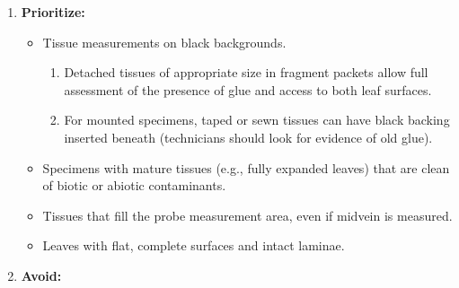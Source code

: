 \documentclass[
  letterpaper,
  DIV=11,
  numbers=noendperiod]{scrreprt}
\providecommand{\tightlist}{%
  \setlength{\itemsep}{0pt}\setlength{\parskip}{0pt}}
\begin{document}
\begin{enumerate}
  \begin{itemize}
  \tightlist
  \item
    Metadata collection is a critical component for understanding
    factors affecting spectral data quality and will provide confidence
    during data aggregation.\\
  \item
    Herbaria and research teams should train technicians in specimen
    selection strategies and scoring metadata to reduce subjectivity.
  \end{itemize}
\item
  \textbf{Prioritize:}

  \begin{itemize}
  \tightlist
  \item
    Tissue measurements on black backgrounds.

    \begin{enumerate}
    \def\labelenumii{\arabic{enumii}.}
    \tightlist
    \item
      Detached tissues of appropriate size in fragment packets allow
      full assessment of the presence of glue and access to both leaf
      surfaces.\\
    \item
      For mounted specimens, taped or sewn tissues can have black
      backing inserted beneath (technicians should look for evidence of
      old glue).\\
    \end{enumerate}
  \item
    Specimens with mature tissues (e.g., fully expanded leaves) that are
    clean of biotic or abiotic contaminants.\\
  \item
    Tissues that fill the probe measurement area, even if midvein is
    measured.\\
  \item
    Leaves with flat, complete surfaces and intact laminae.
  \end{itemize}
\item
  \textbf{Avoid:}


\end{enumerate}
\end{document}
